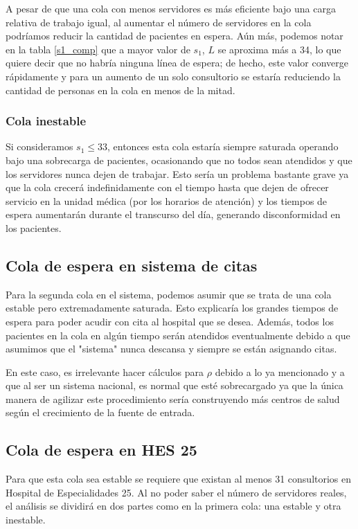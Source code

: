 \documentclass[10pt]{article}
\begin{document}
    A pesar de que una cola con menos servidores es más eficiente bajo una carga relativa de trabajo igual, al aumentar el número de servidores en la cola podríamos reducir la cantidad de pacientes en espera. Aún más, podemos notar en la tabla \ref{s1_comp} que a mayor valor de $s_{1}$, $L$ se aproxima más a 34, lo que quiere decir que no habría ninguna línea de espera; de hecho, este valor converge rápidamente y para un aumento de un solo consultorio se estaría reduciendo la cantidad de personas en la cola en menos de la mitad.
    
    \subsubsection{Cola inestable} \label{sssec:inestable1}
    Si consideramos $s_{1} \leq 33$, entonces esta cola estaría siempre saturada operando bajo una sobrecarga de pacientes, ocasionando que no todos sean atendidos y que los servidores nunca dejen de trabajar. Esto sería un problema bastante grave ya que la cola crecerá indefinidamente con el tiempo hasta que dejen de ofrecer servicio en la unidad médica (por los horarios de atención) y los tiempos de espera aumentarán durante el transcurso del día, generando disconformidad en los pacientes.
    
    \subsection{Cola de espera en sistema de citas}
    Para la segunda cola en el sistema, podemos asumir que se trata de una cola estable pero extremadamente saturada. Esto explicaría los grandes tiempos de espera para poder acudir con cita al hospital que se desea. Además, todos los pacientes en la cola en algún tiempo serán atendidos eventualmente debido a que asumimos que el "sistema" nunca descansa y siempre se están asignando citas.
    
    En este caso, es irrelevante hacer cálculos para $\rho$ debido a lo ya mencionado y a que al ser un sistema nacional, es normal que esté sobrecargado ya que la única manera de agilizar este procedimiento sería construyendo más centros de salud según el crecimiento de la fuente de entrada.
    
    \subsection{Cola de espera en HES 25}
    Para que esta cola sea estable se requiere que existan al menos 31 consultorios en Hospital de Especialidades 25. Al no poder saber el número de servidores reales, el análisis se dividirá en dos partes como en la primera cola: una estable y otra inestable.
    
\end{document}
